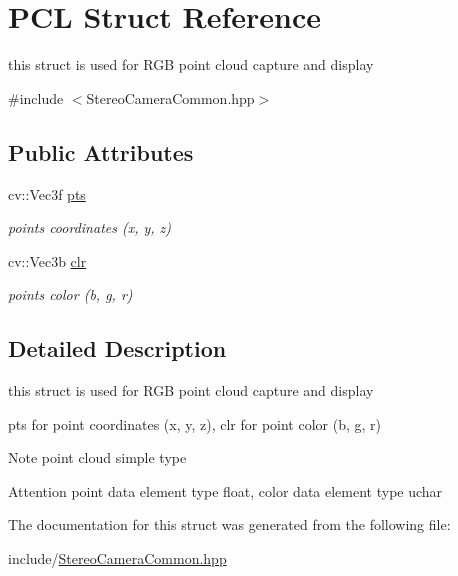 \hypertarget{struct_p_c_l}{}\section{P\+CL Struct Reference}
\label{struct_p_c_l}


this struct is used for R\+GB point cloud capture and display  




{\ttfamily \#include $<$Stereo\+Camera\+Common.\+hpp$>$}

\subsection*{Public Attributes}
\begin{DoxyCompactItemize}
\item 
\mbox{\label{struct_p_c_l_a07c28b7f533724d91ec4a9e461989d8c}} 
cv\+::\+Vec3f \hyperlink{struct_p_c_l_a07c28b7f533724d91ec4a9e461989d8c}{pts}
\begin{DoxyCompactList}\small\item\em points coordinates (x, y, z) \end{DoxyCompactList}\item 
\mbox{\label{struct_p_c_l_a6555550c790378b130273dd6ae3a2158}} 
cv\+::\+Vec3b \hyperlink{struct_p_c_l_a6555550c790378b130273dd6ae3a2158}{clr}
\begin{DoxyCompactList}\small\item\em points color (b, g, r) \end{DoxyCompactList}\end{DoxyCompactItemize}


\subsection{Detailed Description}
this struct is used for R\+GB point cloud capture and display 

pts for point coordinates (x, y, z), clr for point color (b, g, r) \begin{DoxyNote}{Note}
point cloud simple type 
\end{DoxyNote}
\begin{DoxyAttention}{Attention}
point data element type float, color data element type uchar 
\end{DoxyAttention}


The documentation for this struct was generated from the following file\+:\begin{DoxyCompactItemize}
\item 
include/\hyperlink{_stereo_camera_common_8hpp}{Stereo\+Camera\+Common.\+hpp}\end{DoxyCompactItemize}
